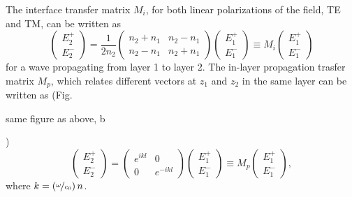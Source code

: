 The interface transfer matrix $M_{i}$, for both linear polarizations
of the field, TE and TM, can be written as\begin{equation}
\left(\begin{array}{c}
E_{2}^{+}\\
E_{2}^{-}\end{array}\right)=\frac{1}{2n_{2}}\left(\begin{array}{cc}
n_{2}+n_{1} & n_{2}-n_{1}\\
n_{2}-n_{1} & n_{2}+n_{1}\end{array}\right)\left(\begin{array}{c}
E_{1}^{+}\\
E_{1}^{-}\end{array}\right)\equiv M_{i}\left(\begin{array}{c}
E_{1}^{+}\\
E_{1}^{-}\end{array}\right)\end{equation}
for a wave propagating from layer 1 to layer 2. The in-layer propagation
trasfer matrix $M_{p}$, which relates different vectors at $z_{1}$
and $z_{2}$ in the same layer can be written as (Fig. %
\begin{lyxgreyedout}
same figure as above, b
\end{lyxgreyedout}
)\begin{equation}
\left(\begin{array}{c}
E_{2}^{+}\\
E_{2}^{-}\end{array}\right)=\left(\begin{array}{cc}
e^{ikl} & 0\\
0 & e^{-ikl}\end{array}\right)\left(\begin{array}{c}
E_{1}^{+}\\
E_{1}^{-}\end{array}\right)\equiv M_{p}\left(\begin{array}{c}
E_{1}^{+}\\
E_{1}^{-}\end{array}\right),\end{equation}
where $k=\left(\nicefrac{\omega}{c_{0}}\right)n$.

